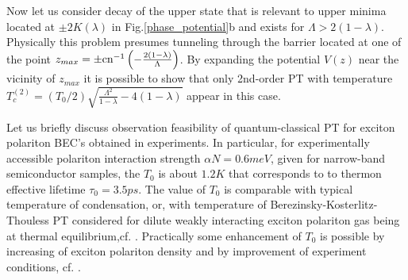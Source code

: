 \documentclass[aps, pre, preprint, groupedaddress, superscriptaddress, showkeys, showpacs] {revtex4-1}
\begin{document}
Now let us consider decay of the upper state that is relevant to  upper minima located at $\pm 2K(\lambda)$ in Fig.\ref{phase_potential}b and exists for $\Lambda > 2(1 - \lambda)$. Physically this problem presumes tunneling through the barrier located at one of the point $z_{max} = \pm \textrm{cn}^{-1} \left( -\frac{2(1 - \lambda)}{\Lambda} \right)$.
By expanding the potential $V(z)$ near the vicinity of $z_{max}$ it is possible to show that only 2nd-order PT with temperature $T_{c}^{(2)} = (T_{0}/ 2) \sqrt{\frac{\Lambda^2}{1 - \lambda} - 4(1 - \lambda)}$ appear in this case.

Let us briefly discuss observation feasibility of quantum-classical PT for exciton polariton BEC's obtained in experiments. In particular, for experimentally accessible polariton interaction strength $\alpha N=0.6meV$, given for narrow-band semiconductor samples, the  $T_{0}$ is about $1.2K$ that corresponds to to thermon effective lifetime  $\tau_{0}=3.5ps$. The value of $T_{0}$ is comparable with typical temperature of condensation, or, with temperature of Berezinsky-Kosterlitz-Thouless PT considered for dilute weakly interacting exciton polariton gas being at thermal equilibrium,cf. \cite{Sanvitto,Guillet}. Practically some enhancement of $T_{0}$ is possible by increasing of exciton polariton density and by improvement of experiment conditions, cf. \cite{Snoke_2017}.  
%
%
\end{document}
